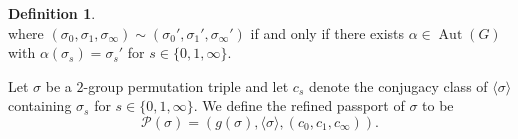 \documentclass{dcthesis}
\newcommand{\defi}[1]{\textsf{#1}}
\newcommand{\mm}[1]{{\color{blue} \sf MM: [#1]}}
\newcommand{\QQal}{{\mathbb Q}^{\textup{al}}}
\newcommand{\QQab}{{\mathbb Q}^{\textup{ab}}}
\DeclareMathOperator{\Aut}{Aut}
\DeclareMathOperator{\Gal}{Gal}
\numberwithin{equation}{section}
\newtheorem{theorem}[equation]{Theorem}
\theoremstyle{definition}
\newtheorem{definition}[equation]{Definition}
\theoremstyle{remark}
\begin{document}
{{{\begin{definition}
\begin{equation}
      \end{equation}
      where $(\sigma_0,\sigma_1,\sigma_\infty)\sim(\sigma_0', \sigma_1', \sigma_\infty')$
      if and only if there exists $\alpha\in\Aut(G)$ with
      $\alpha(\sigma_s) = \sigma_s'$ for $s\in\{0,1,\infty\}$.
      \par
      Let $\sigma$ be a $2$-group
      permutation triple
      and let $c_s$ denote the conjugacy
      class of $\langle\sigma\rangle$
      containing $\sigma_s$ for
      $s\in \{0,1,\infty\}$.
      We define the
      \defi{refined passport of $\sigma$}
      to be
      \begin{equation}
        \label{eqn:refinedpassportofsigma}
        \mathscr{P}(\sigma)
        =(g(\sigma), \langle\sigma\rangle, (c_0,c_1,c_\infty)).
      \end{equation}
    \end{definition}
  }
}}
\end{document}
